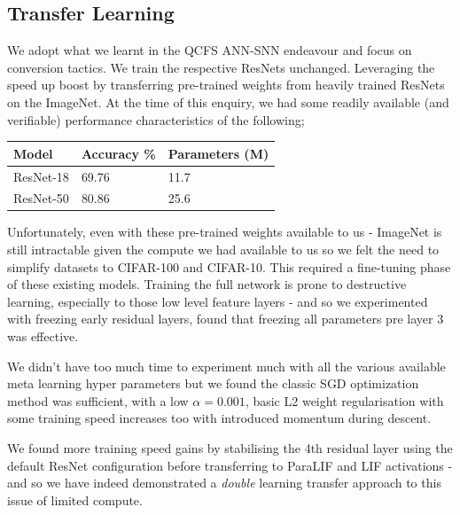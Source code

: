 \documentclass[conference]{IEEEtran}
\begin{document}
\subsection{Transfer Learning}
We adopt what we learnt in the QCFS ANN-SNN endeavour and focus on conversion tactics. We train the respective ResNets unchanged. Leveraging the speed up boost by transferring pre-trained weights from heavily trained ResNets on the ImageNet. At the time of this enquiry, we had some readily available (and verifiable) performance characteristics of the following;

\vspace{0.5cm}
\begin{table}[ht]
\centering
\begin{tabular}{ l l l }
  \toprule
  Model & \multicolumn{1}{c}{Accuracy \%} & \multicolumn{1}{c}{Parameters (M)} \\
  \midrule
  ResNet-18 & \num{69.76} & \num{11.7} \\
  ResNet-50 & \num{80.86} & \num{25.6} \\
  \bottomrule
\end{tabular}
\end{table}

\pagebreak

Unfortunately, even with these pre-trained weights available to us - ImageNet is still intractable given the compute we had available to us so we felt the need to simplify datasets to CIFAR-100 and CIFAR-10. This required a fine-tuning phase of these existing models. Training the full network is prone to destructive learning, especially to those low level feature layers - and so we experimented with freezing early residual layers, found that freezing all parameters pre layer 3 was effective.

We didn't have too much time to experiment much with all the various available meta learning hyper parameters but we found the classic SGD optimization method was sufficient, with a low $\alpha=0.001$, basic L2 weight regularisation with some training speed increases too with introduced momentum during descent.

We found more training speed gains by stabilising the 4th residual layer using the default ResNet configuration before transferring to ParaLIF and LIF activations - and so we have indeed demonstrated a \emph{double} learning transfer approach to this issue of limited compute.
\end{document}
